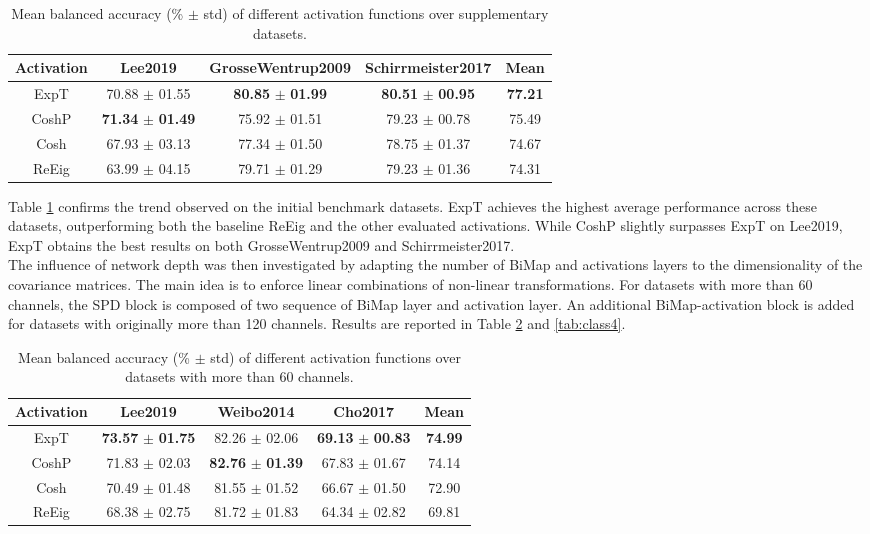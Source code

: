 \documentclass[11pt,a4paper]{article}
\begin{document}
\begin{table}[H]
\centering
\caption{Mean balanced accuracy (\% $\pm$ std) of different activation functions over supplementary datasets.}

\begin{tabular}{|c|c|c|c|c|}
\hline
\textbf{Activation} & \textbf{Lee2019} & \textbf{GrosseWentrup2009} & \textbf{Schirrmeister2017} & \textbf{Mean} \\
\hline
 ExpT   & 70.88 $\pm$ 01.55 & \textbf{80.85} $\pm$ \textbf{01.99} & \textbf{80.51} $\pm$ \textbf{00.95} & \textbf{77.21} \\
 CoshP  & \textbf{71.34} $\pm$ \textbf{01.49} & 75.92 $\pm$ 01.51& 79.23 $\pm$ 00.78 & 75.49\\
 Cosh   & 67.93 $\pm$ 03.13 &77.34 $\pm$ 01.50 & 78.75 $\pm$ 01.37 & 74.67\\  
 ReEig  & 63.99 $\pm$ 04.15 & 79.71 $\pm$ 01.29 & 79.23 $\pm$ 01.36 & 74.31\\
\hline
\end{tabular}
\label{tab:class2}
\end{table}


\noindent Table \ref{tab:class2} confirms the trend observed on the initial benchmark datasets. ExpT achieves the highest average performance across these datasets, outperforming both the baseline ReEig and the other evaluated activations. While CoshP slightly surpasses ExpT on Lee2019, ExpT obtains the best results on both GrosseWentrup2009 and Schirrmeister2017. \\
\newline 
\noindent The influence of network depth was then investigated by adapting the number of BiMap and activations layers to the dimensionality of the covariance matrices. The main idea is to enforce linear combinations of non-linear transformations. For datasets with more than 60 channels, the SPD block is composed of two sequence of BiMap layer and activation layer. An additional BiMap-activation block is added for datasets with originally more than 120 channels. Results are reported in Table \ref{tab:class3} and \ref{tab:class4}.

\begin{table}[H]
\centering
\caption{Mean balanced accuracy (\% $\pm$ std) of different activation functions over datasets with more than 60 channels.}
\begin{tabular}{|c|c|c|c|c|}
\hline
\textbf{Activation} & \textbf{Lee2019} & \textbf{Weibo2014} & \textbf{Cho2017} & \textbf{Mean}\\
\hline
 ExpT & \textbf{73.57} $\pm$ \textbf{01.75} & 82.26 $\pm$ 02.06 & \textbf{69.13} $\pm$ \textbf{00.83} & \textbf{74.99}\\
 CoshP  & 71.83 $\pm$ 02.03 & \textbf{82.76} $\pm$ \textbf{01.39} & 67.83 $\pm$ 01.67 & 74.14\\
 Cosh   & 70.49 $\pm$ 01.48 & 81.55 $\pm$ 01.52 & 66.67 $\pm$ 01.50 & 72.90\\  
 ReEig  & 68.38 $\pm$ 02.75 & 81.72 $\pm$ 01.83& 64.34  $\pm$ 02.82 & 69.81 \\
\hline
\end{tabular}
\label{tab:class3}
\end{table}
\end{document}
